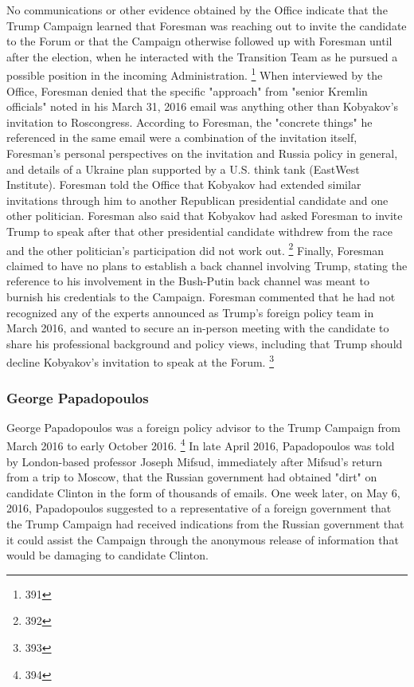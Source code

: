 No communications or other evidence obtained by the Office indicate that the Trump Campaign learned that Foresman was reaching out to invite the candidate to the Forum or that the Campaign otherwise followed up with Foresman until after the election, when he interacted with the Transition Team as he pursued a possible position in the incoming Administration.%
\footnote{391}
When interviewed by the Office, Foresman denied that the specific "approach" from "senior Kremlin officials" noted in his March 31, 2016 email was anything other than Kobyakov's invitation to Roscongress.
According to Foresman, the "concrete things" he referenced in the same email were a combination of the invitation itself, Foresman's personal perspectives on the invitation and Russia policy in general, and details of a Ukraine plan supported by a U.S. think tank (EastWest Institute).
Foresman told the Office that Kobyakov had extended similar invitations through him to another Republican presidential candidate and one other politician.
Foresman also said that Kobyakov had asked Foresman to invite Trump to speak after that other presidential candidate withdrew from the race and the other politician's participation did not work out.%
\footnote{392}
Finally, Foresman claimed to have no plans to establish a back channel involving Trump, stating the reference to his involvement in the Bush-Putin back channel was meant to burnish his credentials to the Campaign.
Foresman commented that he had not recognized any of the experts announced as Trump's foreign policy team in March 2016, and wanted to secure an in-person meeting with the candidate to share his professional background and policy views, including that Trump should decline Kobyakov's invitation to speak at the Forum.%
\footnote{393}

\subsubsection{George Papadopoulos}

George Papadopoulos was a foreign policy advisor to the Trump Campaign from March 2016 to early October 2016.%
\footnote{394}
In late April 2016, Papadopoulos was told by London-based professor Joseph Mifsud, immediately after Mifsud's return from a trip to Moscow, that the Russian government had obtained "dirt" on candidate Clinton in the form of thousands of emails.
One week later, on May 6, 2016, Papadopoulos suggested to a representative of a foreign government that the Trump Campaign had received indications from the Russian government that it could assist the Campaign through the anonymous release of information that would be damaging to candidate Clinton.

